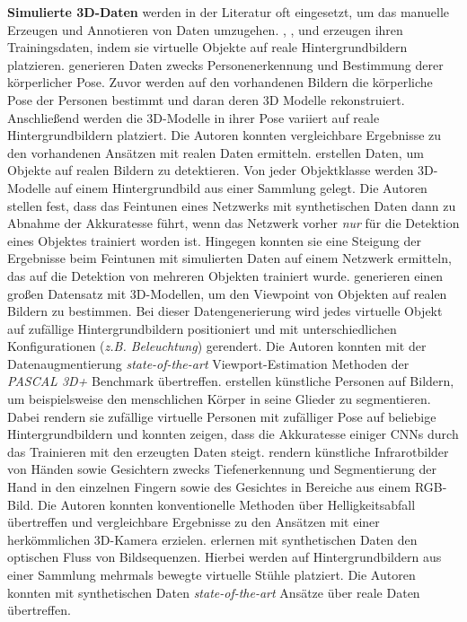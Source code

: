 \textbf{Simulierte 3D-Daten} werden in der Literatur oft eingesetzt, um das manuelle Erzeugen und Annotieren von Daten umzugehen. \citet{pishchulinArticulatedPeopleDetection2012a}, \citet{pengLearningDeepObject2014}, \citet{suRenderCNNViewpoint2015} und \citet{varolLearningSyntheticHumans2017} erzeugen ihren Trainingsdaten, indem sie virtuelle Objekte auf reale Hintergrundbildern platzieren. \citet{pishchulinArticulatedPeopleDetection2012a} generieren Daten zwecks Personenerkennung und Bestimmung derer körperlicher Pose. Zuvor werden auf den vorhandenen Bildern die körperliche Pose der Personen bestimmt und daran deren 3D Modelle rekonstruiert. Anschließend werden die 3D-Modelle in ihrer Pose variiert auf reale Hintergrundbildern platziert. Die Autoren konnten vergleichbare Ergebnisse zu den vorhandenen Ansätzen mit realen Daten ermitteln. \citet{pengLearningDeepObject2014} erstellen Daten, um Objekte auf realen Bildern zu detektieren. Von jeder Objektklasse werden 3D-Modelle auf einem Hintergrundbild aus einer Sammlung gelegt. Die Autoren stellen fest, dass das Feintunen eines Netzwerks mit synthetischen Daten dann zu Abnahme der Akkuratesse führt, wenn das Netzwerk vorher \textit{nur} für die Detektion eines Objektes trainiert worden ist. Hingegen konnten sie eine Steigung der Ergebnisse beim Feintunen mit simulierten Daten auf einem Netzwerk ermitteln, das auf die Detektion von mehreren Objekten trainiert wurde. \citet{suRenderCNNViewpoint2015} generieren einen großen Datensatz mit 3D-Modellen, um den Viewpoint von Objekten auf realen Bildern zu bestimmen. Bei dieser Datengenerierung wird jedes virtuelle Objekt auf zufällige Hintergrundbildern positioniert und mit unterschiedlichen Konfigurationen (\textit{z.B. Beleuchtung}) gerendert. Die Autoren konnten mit der Datenaugmentierung \textit{state-of-the-art} Viewport-Estimation Methoden der \textit{PASCAL 3D+}\cite{xiangPASCALBenchmark3D2014} Benchmark übertreffen. \citet{varolLearningSyntheticHumans2017} erstellen künstliche Personen auf Bildern, um beispielsweise den menschlichen Körper in seine Glieder zu segmentieren. Dabei rendern sie zufällige virtuelle Personen mit zufälliger Pose auf beliebige Hintergrundbildern und konnten zeigen, dass die Akkuratesse einiger CNNs durch das Trainieren mit den erzeugten Daten steigt. \citet{fanelloLearningBeDepth2014} rendern künstliche Infrarotbilder von Händen sowie Gesichtern zwecks Tiefenerkennung und Segmentierung der Hand in den einzelnen Fingern sowie des Gesichtes in Bereiche aus einem RGB-Bild. Die Autoren konnten konventionelle Methoden über  Helligkeitsabfall übertreffen und vergleichbare Ergebnisse zu den Ansätzen mit einer herkömmlichen 3D-Kamera erzielen. \citet{dosovitskiyFlowNetLearningOptical2015} erlernen mit synthetischen Daten den optischen Fluss von Bildsequenzen.  Hierbei werden auf Hintergrundbildern aus einer Sammlung mehrmals bewegte virtuelle Stühle platziert. Die Autoren konnten mit synthetischen Daten \textit{state-of-the-art} Ansätze über reale Daten übertreffen.

